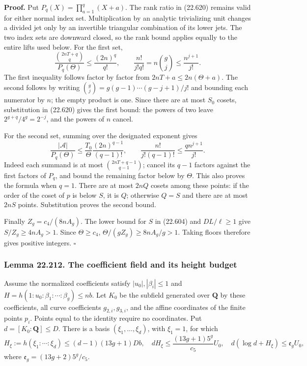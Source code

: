 \documentclass[
  11pt,
  a4paper,
]{article}
\begin{document}
\textbf{Proof.} Put \(P_q(X)=\prod_{a=1}^q(X+a)\). The rank ratio in
(22.620) remains valid for either normal index set. Multiplication by an
analytic trivializing unit changes a divided jet only by an invertible
triangular combination of its lower jets. The two index sets are
downward closed, so the rank bound applies equally to the entire lifts
used below. For the first set, \[
 \frac{\binom{2nT+q}{q}}{P_q(\Theta)}
 \le\frac{(2n)^q}{q!},\qquad
 \frac{n!}{j!q!}=n\binom gj\le\frac{n^{j+1}}{j!}.
 \tag{22.624}
\] The first inequality follows factor by factor from
\(2nT+a\le2n(\Theta+a)\). The second follows by writing
\(\binom gj=g(g-1)\cdots(g-j+1)/j!\) and bounding each numerator by
\(n\); the empty product is one. Since there are at most \(S_0\) cosets,
substitution in (22.620) gives the first bound: the powers of two leave
\(2^{g+q}/4^g=2^{-j}\), and the powers of \(n\) cancel.

For the second set, summing over the designated exponent gives \[
 \frac{|\mathcal A|}{P_q(\Theta)}
 \le\frac{T_0}{\Theta}\frac{(2n)^{q-1}}{(q-1)!},
 \qquad
 \frac{n!}{j!(q-1)!}\le\frac{q n^{j+1}}{j!}.
 \tag{22.625}
\] Indeed each summand is at most \(\binom{2nT+q-1}{q-1}\); cancel its
\(q-1\) factors against the first factors of \(P_q\), and bound the
remaining factor below by \(\Theta\). This also proves the formula when
\(q=1\). There are at most \(2nQ\) cosets among these points: if the
order of the coset of \(p\) is below \(S\), it is \(Q\); otherwise
\(Q=S\) and there are at most \(2nS\) points. Substitution proves the
second bound.

Finally \(Z_g=c_4/(8nA_g)\). The lower bound for \(S\) in (22.604) and
\(DL/\ell\ge1\) give \(S/Z_g\ge4nA_g>1\). Since \(\Theta\ge c_4\),
\(\Theta/(gZ_g)\ge8nA_g/g>1\). Taking floors therefore gives positive
integers. \(\square\)

\subsubsection{Lemma 22.212. The coefficient field and its height
budget}\label{lemma-22.212.-the-coefficient-field-and-its-height-budget}

Assume the normalized coefficients satisfy \(|u_0|,|\beta_i|\le1\) and
\(H=h(1:u_0:\beta_1:\cdots:\beta_g)\le nb\). Let \(K_0\) be the subfield
generated over \(\mathbf Q\) by these coefficients, all curve
coefficients \(g_{2,i},g_{3,i}\), and the affine coordinates of the
finite points \(p_i\). Points equal to the identity require no
coordinates. Put \(d=[K_0:\mathbf Q]\le D\). There is a basis
\((\xi_1,\ldots,\xi_d)\), with \(\xi_1=1\), for which \[
 H_\xi:=h(\xi_1:\cdots:\xi_d)
 \le(d-1)(13g+1)Db,
 \quad
 dH_\xi\le\frac{(13g+1)5^g}{c_5}U_0,
 \quad
 d(\log d+H_\xi)\le\mathfrak e_gU_0,
 \tag{22.626}
\] where \(\mathfrak e_g=(13g+2)5^g/c_5\).
\end{document}
